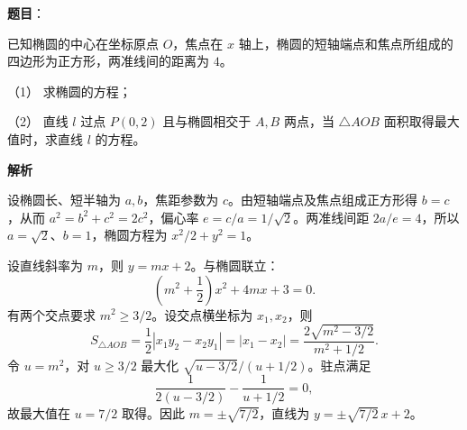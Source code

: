 \begin{answer}

\textbf{题目}：

已知椭圆的中心在坐标原点 $O$，焦点在 $x$ 轴上，椭圆的短轴端点和焦点所组成的四边形为正方形，两准线间的距离为 $4$。

（1） 求椭圆的方程；

（2） 直线 $l$ 过点 $P(0,2)$ 且与椭圆相交于 $A,B$ 两点，当 $\triangle AOB$ 面积取得最大值时，求直线 $l$ 的方程。

\textbf{解析}


设椭圆长、短半轴为 $a,b$，焦距参数为 $c$。由短轴端点及焦点组成正方形得 $b=c$，从而 $a^2=b^2+c^2=2c^2$，偏心率 $e=c/a=1/\sqrt2$。两准线间距 $2a/e=4$，所以 $a=\sqrt2$、$b=1$，椭圆方程为 $x^2/2+y^2=1$。


设直线斜率为 $m$，则 $y=mx+2$。与椭圆联立：
\nopagebreak[4]
\[
\left(m^2+\frac12\right)x^2+4mx+3=0.
\]
有两个交点要求 $m^2\ge3/2$。设交点横坐标为 $x_1,x_2$，则
\nopagebreak[4]
\[
S_{\triangle AOB}=\frac12|x_1y_2-x_2y_1|=|x_1-x_2|
=\frac{2\sqrt{m^2-3/2}}{m^2+1/2}.
\]
令 $u=m^2$，对 $u\ge3/2$ 最大化 $\sqrt{u-3/2}/(u+1/2)$。驻点满足
\nopagebreak[4]
\[
\frac{1}{2(u-3/2)}-\frac{1}{u+1/2}=0,
\]
故最大值在 $u=7/2$ 取得。因此 $m=\pm\sqrt{7/2}$，直线为 $y=\pm\sqrt{7/2}\,x+2$。



\end{answer}
